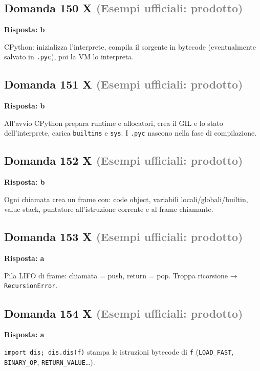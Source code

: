 \documentclass[a4paper,11pt]{article}
\begin{document}
\subsection*{Domanda 150 X \hfill {\small \textcolor{gray}{(Esempi ufficiali: prodotto)}}}
\textbf{Risposta: b}\par
CPython: inizializza l'interprete, compila il sorgente in bytecode (eventualmente salvato in \texttt{.pyc}), poi la VM lo interpreta.



\subsection*{Domanda 151 X \hfill {\small \textcolor{gray}{(Esempi ufficiali: prodotto)}}}
\textbf{Risposta: b}\par
All'avvio CPython prepara runtime e allocatori, crea il GIL e lo stato dell'interprete, carica \texttt{builtins} e \texttt{sys}. I \texttt{.pyc} nascono nella fase di compilazione.



\subsection*{Domanda 152 X \hfill {\small \textcolor{gray}{(Esempi ufficiali: prodotto)}}}
\textbf{Risposta: b}\par
Ogni chiamata crea un frame con: code object, variabili locali/globali/builtin, value stack, puntatore all'istruzione corrente e al frame chiamante.



\subsection*{Domanda 153 X \hfill {\small \textcolor{gray}{(Esempi ufficiali: prodotto)}}}
\textbf{Risposta: a}\par
Pila LIFO di frame: chiamata = push, return = pop. Troppa ricorsione → \texttt{RecursionError}.



\subsection*{Domanda 154 X \hfill {\small \textcolor{gray}{(Esempi ufficiali: prodotto)}}}
\textbf{Risposta: a}\par
\texttt{import dis; dis.dis(f)} stampa le istruzioni bytecode di \texttt{f} (\texttt{LOAD\_FAST}, \texttt{BINARY\_OP}, \texttt{RETURN\_VALUE}…).
\end{document}
